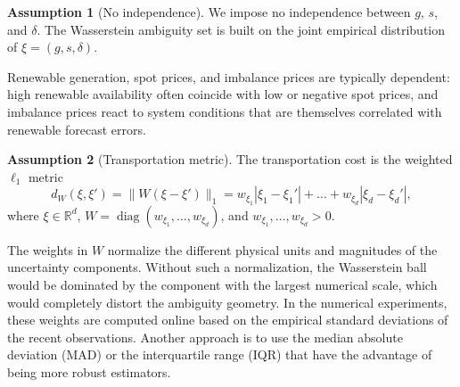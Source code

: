 \documentclass[11pt]{article}
\theoremstyle{plain}
\theoremstyle{definition}
\newtheorem{assumption}{Assumption}
\begin{document}
\begin{assumption}[No independence] 
    \label{ass:no-independence} 
    We impose no independence between $g$, $s$, and $\delta$. 
    The Wasserstein ambiguity set is built on the joint empirical distribution of $\xi=(g,s,\delta)$. 
\end{assumption} 

Renewable generation, spot prices, and imbalance prices are typically dependent: high renewable availability often coincide with low or negative spot prices, and imbalance prices react to system conditions that are themselves correlated with renewable forecast errors. 


\begin{assumption}[Transportation metric] 
    \label{ass:transportation-metric} 
    The transportation cost is the weighted $\ell_1$ metric \[ d_W(\xi,\xi') = \|W(\xi-\xi')\|_1 = w_{\xi_1}|\xi_1-\xi_1'|+\dots+w_{\xi_d}|\xi_d-\xi_d'|, \] where $\xi\in\mathbb{R}^d$, $W=\operatorname{diag}(w_{\xi_1},\dots,w_{\xi_d})$, and $w_{\xi_1},\dots,w_{\xi_d}>0$. 
\end{assumption} 

The weights in $W$ normalize the different physical units and magnitudes of the uncertainty components. 
Without such a normalization, the Wasserstein ball would be dominated by the component with the largest numerical scale, which would completely distort the ambiguity geometry. 
In the numerical experiments, these weights are computed online based on the empirical standard deviations of the recent observations. 
Another approach is to use the median absolute deviation (MAD) or the interquartile range (IQR) that have the advantage of being more robust estimators.
\end{document}
